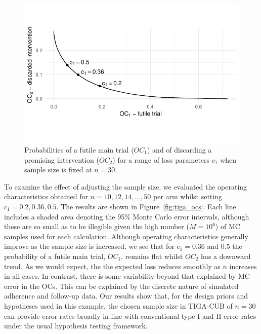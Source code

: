 \documentclass[AMA,STIX1COL]{WileyNJD-v2}
\begin{document}
\begin{figure}
\centering
\includegraphics[scale=0.8]{./figures/tiga_n30}
\caption{Probabilities of a futile main trial ($OC_1$) and of discarding a promising intervention ($OC_2$) for a range of loss parameters $c_1$ when sample size is fixed at $n=30$.}
\label{fig:tiga_n60}
\end{figure}

%

To examine the effect of adjusting the sample size, we evaluated the operating characteristics obtained for $n = 10, 12, 14, \ldots , 50$ per arm whilst setting $c_1 = 0.2, 0.36, 0.5$. The results are shown in Figure~\ref{fig:tiga_ocs}. Each line includes a shaded area denoting the 95\% Monte Carlo error intervals, although these are so small as to be illegible given the high number ($M = 10^6$) of MC samples used for each calculation. Although operating characteristics generally improve as the sample size is increased, we see that for $c_1 = 0.36$ and 0.5 the probability of a futile main trial, $OC_1$, remains flat whilst $OC_2$ has a downward trend. As we would expect, the  the expected loss reduces smoothly as $n$ increases in all cases. In contrast, there is some variability beyond that explained by MC error in the OCs. This can be explained by the discrete nature of simulated adherence and follow-up data. Our results show that, for the design priors and hypotheses used in this example, the chosen sample size in TIGA-CUB of $n=30$ can provide error rates broadly in line with conventional type I and II error rates under the usual hypothesis testing framework.
\end{document}
